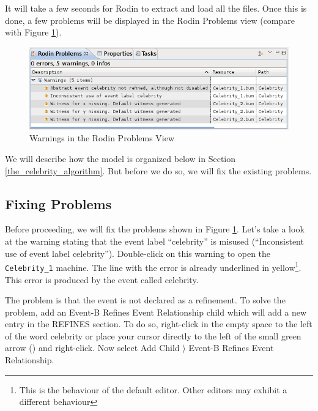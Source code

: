 It will take a few seconds for Rodin to extract and load all the files. Once this is done, a few problems will be displayed in the Rodin Problems view (compare with Figure \ref{fig_tut_08_rodin_problemview}).

\begin{figure}[!ht]
\begin{center}
	\includegraphics{img/tutorial/tut_08_rodin_problems.png}
	\caption{Warnings in the Rodin Problems View}
	\label{fig_tut_08_rodin_problemview}
\end{center}
\end{figure}

We will describe how the model is organized below in Section \ref{the_celebrity_algorithm}.  But before we do so, we will fix the existing problems.

\subsection{Fixing Problems}
\label{tut_celebrity_fixing problems}

Before proceeding, we will fix the problems shown in Figure \ref{fig_tut_08_rodin_problemview}. Let's take a look at the warning stating that the event label ``celebrity'' is misused (``Inconsistent use of event label celebrity''). Double-click on this warning to open the \texttt{Celebrity\_1} machine. The line with the error is already underlined in yellow\footnote{This is the behaviour of the default editor.  Other editors may exhibit a different behaviour}. This error is produced by the event called \textsf{celebrity}.

The problem is that the event is not declared as a refinement. To solve the problem, add an \textsf{Event-B Refines Event Relationship} child which will add a new entry in the \textsf{REFINES} section.  To do so, right-click in the empty space to the left of the word \textsf{celebrity} or place your cursor directly to the left of the small green arrow () and right-click. Now select \textsf{Add Child $\rangle$ Event-B Refines Event Relationship}.

